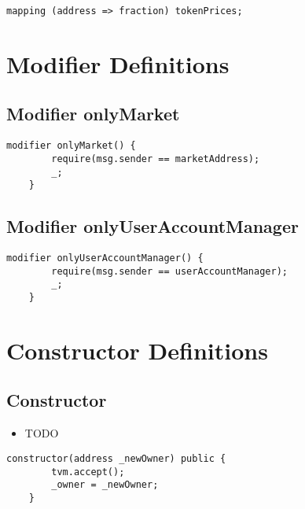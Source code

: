 \begin{lstlisting}[firstnumber=16]
    mapping (address => fraction) tokenPrices;
\end{lstlisting}

\section{Modifier Definitions}


\subsection{Modifier onlyMarket}


\begin{lstlisting}[firstnumber=176]
    modifier onlyMarket() {
        require(msg.sender == marketAddress);
        _;
    }
\end{lstlisting}

\subsection{Modifier onlyUserAccountManager}


\begin{lstlisting}[firstnumber=181]
    modifier onlyUserAccountManager() {
        require(msg.sender == userAccountManager);
        _;
    }
\end{lstlisting}

\section{Constructor Definitions}


\subsection{Constructor}

\noindent\begin{itemize}
\item TODO
\end{itemize}

\begin{lstlisting}[firstnumber=20]
    constructor(address _newOwner) public {
        tvm.accept();
        _owner = _newOwner;
    }
\end{lstlisting}

